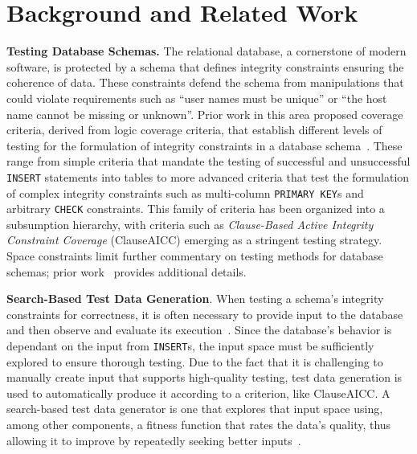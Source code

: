 
\section{Background and Related Work}
\vspace*{-.05in}




{\bf Testing Database Schemas.} The relational database, a cornerstone of modern software, is protected by a schema that
defines integrity constraints ensuring the coherence of data. These constraints defend the schema from manipulations
that could violate requirements such as ``user names must be unique'' or ``the host name cannot be missing or unknown''.
Prior work in this area proposed coverage criteria, derived from logic coverage criteria, that establish different
levels of testing for the formulation of integrity constraints in a database schema~\cite{mcminn2015}. These range from
simple criteria that mandate the testing of successful and unsuccessful {\tt INSERT} statements into tables to more
advanced criteria that test the formulation of complex integrity constraints such as multi-column {\tt PRIMARY~KEY}s and
arbitrary {\tt CHECK} constraints. This family of criteria has been organized into a subsumption hierarchy, with
criteria such as {\em Clause-Based Active Integrity Constraint Coverage} (ClauseAICC) emerging as a stringent testing
strategy. Space constraints limit further commentary on testing methods
for database schemas; prior work~\cite{mcminn2015} provides additional details.


{\bf Search-Based Test Data Generation}. When testing a schema's integrity constraints for correctness, it is often
necessary to provide input to the database and then observe and evaluate its execution~\cite{kapfhammer2013}.  Since the
database's behavior is dependant on the input from {\tt INSERT}s, the input space must be sufficiently explored to ensure
thorough testing.  Due to the fact that it is challenging to manually create input that supports high-quality testing,
test data generation is used to automatically produce it according to a criterion, like ClauseAICC. A search-based test
data generator is one that explores that input space using, among other components, a fitness function that rates the
data's quality, thus allowing it to improve by repeatedly seeking better inputs~\cite{mcminn2004a}.


